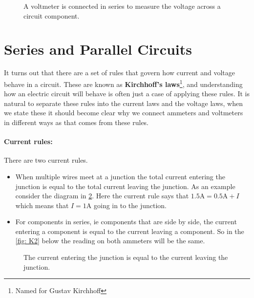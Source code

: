 \documentclass[a4paper,12pt]{book}
\begin{document}
\begin{figure}[ht]
    \centering
    \caption{A voltmeter is connected in series to measure the voltage across a circuit component.}
    \label{fig: voltmeter}
\end{figure}

\section{Series and Parallel Circuits}
It turns out that there are a set of rules that govern how current and voltage behave in a circuit. These are known as \textbf{Kirchhoff's laws}\footnote{Named for Gustav Kirchhoff}, and understanding how an electric circuit will behave is often just a case of applying these rules. It is natural to separate these rules into the current laws and the voltage laws, when we state these it should become clear why we connect ammeters and voltmeters in different ways as that comes from these rules. \\

\paragraph{Current rules:} There are two current rules.
\begin{itemize}
\setlength{\itemsep}{-5pt}
    \item[1)] When multiple wires meet at a junction the total current entering the junction is equal to the total current leaving the junction. As an example consider the diagram in \cref{fig: K1}. Here the current rule says that $1.5\text{A}=0.5\text{A}+I$ which means that $I=1\text{A}$ going in to the junction.
    \item[2)] For components in series, ie components that are side by side, the current entering a component is equal to the current leaving a component. So in the \cref{fig: K2} below the reading on both ammeters will be the same.
\end{itemize}
   \begin{figure}[ht]
    \centering
    \caption{The current entering the junction is equal to the current leaving the junction.}
    \label{fig: K1}
\end{figure}
\end{document}
